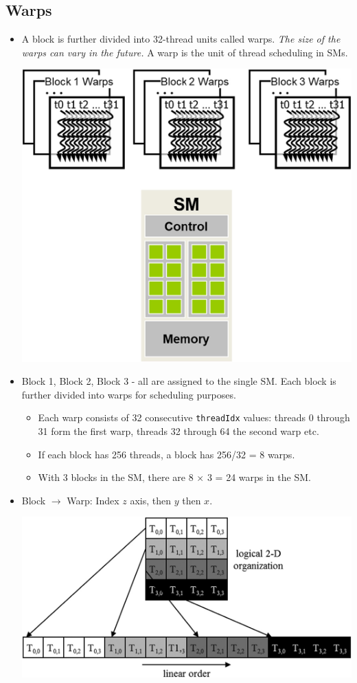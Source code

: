 \subsection{Warps}
\begin{itemize}
    \item A block is further divided into 32-thread units called warps. \textit{The size of the warps can vary in the future.} A warp is the unit of thread scheduling in SMs.
          \begin{center}
              \includegraphics[width=0.8\linewidth]{Images/CompArch/Warps.png}
          \end{center}
    \item Block 1, Block 2, Block 3 - all are assigned to the single SM. Each block is further divided into warps for scheduling purposes.
          \begin{itemize}
              \item Each warp consists of 32 consecutive \texttt{threadIdx} values: threads 0 through 31 form the first warp, threads 32 through 64 the second warp etc.
              \item If each block has 256 threads, a block has 256/32 = 8 warps.
              \item With 3 blocks in the SM, there are 8 $\times$ 3 = 24 warps in the SM.
          \end{itemize}
    \item Block $\rightarrow$ Warp: Index $z$ axis, then $y$ then $x$.
          \begin{center}
              \includegraphics[width=0.7\linewidth]{Images/CompArch/Unrwrapping.png}

\end{center}
\end{itemize}
